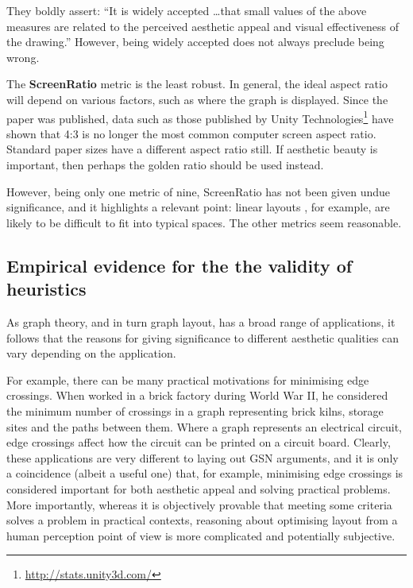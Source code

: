 They boldly assert: ``It is widely accepted \ldots that small values of the above measures are related to the perceived aesthetic appeal and visual effectiveness of the drawing.''
However, being widely accepted does not always preclude being wrong.

The \textbf{ScreenRatio} metric is the least robust.
In general, the ideal aspect ratio will depend on various factors, such as where the graph is displayed.
Since the paper was published, data such as those published by Unity Technologies\footnote{\url{http://stats.unity3d.com/}} have shown that 4:3 is no longer the most common computer screen aspect ratio.
Standard paper sizes have a different aspect ratio still.
If aesthetic beauty is important, then perhaps the golden ratio  should be used instead.

However, being only one metric of nine, ScreenRatio has not been given undue significance, and it highlights a relevant point: linear layouts , for example, are likely to be difficult to fit into typical spaces.
The other metrics seem reasonable.


\subsection{Empirical evidence for the the validity of heuristics}

As graph theory, and in turn graph layout, has a broad range of applications, it follows that the reasons for giving significance to different aesthetic qualities can vary depending on the application.

For example, there can be many practical motivations for minimising edge crossings.
When \citet{JGT:JGT3190010105} worked in a brick factory during World War II,
he considered the minimum number of crossings in a graph representing
brick kilns, storage sites and the paths between them.
Where a graph represents an electrical circuit, edge crossings affect how the circuit can be printed on a circuit board.
Clearly, these applications are very different to laying out GSN arguments, and it is only a coincidence (albeit a useful one) that, for example, minimising edge crossings is considered important for both aesthetic appeal and solving practical problems.
More importantly, whereas it is objectively provable that meeting some criteria solves a problem in practical contexts, reasoning about optimising layout from a human perception point of view is more complicated and potentially subjective.

